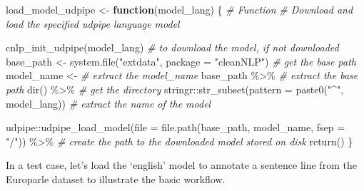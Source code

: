 \documentclass[
]{article}
\newenvironment{Shaded}{\begin{snugshade}}{\end{snugshade}}
\newcommand{\AttributeTok}[1]{\textcolor[rgb]{0.77,0.63,0.00}{#1}}
\newcommand{\CommentTok}[1]{\textcolor[rgb]{0.56,0.35,0.01}{\textit{#1}}}
\newcommand{\ControlFlowTok}[1]{\textcolor[rgb]{0.13,0.29,0.53}{\textbf{#1}}}
\newcommand{\FunctionTok}[1]{\textcolor[rgb]{0.00,0.00,0.00}{#1}}
\newcommand{\NormalTok}[1]{#1}
\newcommand{\OtherTok}[1]{\textcolor[rgb]{0.56,0.35,0.01}{#1}}
\newcommand{\SpecialCharTok}[1]{\textcolor[rgb]{0.00,0.00,0.00}{#1}}
\newcommand{\StringTok}[1]{\textcolor[rgb]{0.31,0.60,0.02}{#1}}
\begin{document}
\begin{Shaded}
\begin{Highlighting}[]
\NormalTok{load\_model\_udpipe }\OtherTok{\textless{}{-}} \ControlFlowTok{function}\NormalTok{(model\_lang) \{}
  \CommentTok{\# Function}
  \CommentTok{\# Download and load the specified udpipe language model}
  
  \FunctionTok{cnlp\_init\_udpipe}\NormalTok{(model\_lang) }\CommentTok{\# to download the model, if not downloaded}
\NormalTok{base\_path }\OtherTok{\textless{}{-}} \FunctionTok{system.file}\NormalTok{(}\StringTok{"extdata"}\NormalTok{, }\AttributeTok{package =} \StringTok{"cleanNLP"}\NormalTok{) }\CommentTok{\# get the base path}
\NormalTok{  model\_name }\OtherTok{\textless{}{-}} \CommentTok{\# extract the model\_name}
\NormalTok{    base\_path }\SpecialCharTok{\%\textgreater{}\%} \CommentTok{\# extract the base path}
    \FunctionTok{dir}\NormalTok{() }\SpecialCharTok{\%\textgreater{}\%} \CommentTok{\# get the directory}
\NormalTok{    stringr}\SpecialCharTok{::}\FunctionTok{str\_subset}\NormalTok{(}\AttributeTok{pattern =} \FunctionTok{paste0}\NormalTok{(}\StringTok{"\^{}"}\NormalTok{, model\_lang)) }\CommentTok{\# extract the name of the model}
  
\NormalTok{  udpipe}\SpecialCharTok{::}\FunctionTok{udpipe\_load\_model}\NormalTok{(}\AttributeTok{file =} \FunctionTok{file.path}\NormalTok{(base\_path, model\_name, }\AttributeTok{fsep =} \StringTok{"/"}\NormalTok{)) }\SpecialCharTok{\%\textgreater{}\%} \CommentTok{\# create the path to the downloaded model stored on disk}
    \FunctionTok{return}\NormalTok{()}
\NormalTok{\}}
\end{Highlighting}
\end{Shaded}

In a test case, let's load the `english' model to annotate a sentence line from the Europarle dataset to illustrate the basic workflow.
\end{document}
